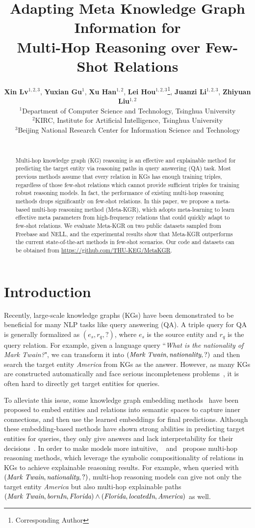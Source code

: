 \documentclass[11pt,a4paper]{article}
\title{Adapting Meta Knowledge Graph Information for \\ Multi-Hop Reasoning over Few-Shot Relations}
\author{
    \textbf{Xin Lv}$^{1,2,3}$, \textbf{Yuxian Gu}$^{1}$, \textbf{Xu Han}$^{1,2}$, \textbf{Lei Hou}$^{1,2,3}$\thanks{\quad Corresponding Author}\hspace{0.5em}, \textbf{Juanzi Li}$^{1,2,3}$, \textbf{Zhiyuan Liu}$^{1,2}$\\
    $^1$Department of Computer Science and Technology, Tsinghua University \\
    $^2$KIRC, Institute for Artificial Intelligence, Tsinghua University \\
     $^3$Beijing National Research Center for Information Science and Technology \\
    \email{\{lv-x18,gu-yx17,hanxu17\}@mails.tsinghua.edu.cn}\\
    \email{\{houlei,lijuanzi,liuzy\}@tsinghua.edu.cn}
    }
\date{}
\begin{document}
\maketitle
\begin{abstract}
Multi-hop knowledge graph (KG) reasoning is an effective and explainable method for predicting the target entity via reasoning paths in query answering (QA) task. Most previous methods assume that every relation in KGs has enough training triples, regardless of those few-shot relations which cannot provide sufficient triples for training robust reasoning models. In fact, the performance of existing multi-hop reasoning methods drops significantly on few-shot relations. In this paper, we propose a meta-based multi-hop reasoning method (Meta-KGR), which adopts meta-learning to learn effective meta parameters from high-frequency relations that could quickly adapt to few-shot relations. We evaluate Meta-KGR on two public datasets sampled from Freebase and NELL, and the experimental results show that Meta-KGR outperforms the current state-of-the-art methods in few-shot scenarios. Our code and datasets can be obtained from  \url{https://github.com/THU-KEG/MetaKGR}.

\end{abstract}

\section{Introduction}

Recently, large-scale knowledge graphs (KGs) have been demonstrated to be beneficial for many NLP tasks like query answering (QA). A triple query for QA is generally formalized as $(e_s, r_q, ?)$, where $e_s$ is the source entity and $r_q$ is the query relation. 
For example, given a language query ``\textit{What is the nationality of Mark Twain?}", we can transform it into $(\emph{Mark Twain}, \textit{nationality}, ?)$ and then search the target entity \emph{America} from KGs as the answer.
However, as many KGs are constructed automatically and face serious incompleteness problems~\cite{TransE}, it is often hard to directly get target entities for queries.

To alleviate this issue, some knowledge graph embedding methods~\cite{TransE,ConvE} have been proposed to embed entities and relations into semantic spaces to capture inner connections, and then use the learned embeddings for final predictions. Although these embedding-based methods have shown strong abilities in predicting target entities for queries, they only give answers and lack interpretability for their decisions~\cite{MultiHop}. In order to make models more intuitive, ~\citet{MINERVA} and~\citet{MultiHop} propose multi-hop reasoning methods, which leverage the symbolic compositionality of relations in KGs to achieve explainable reasoning results. For example, when queried with $(\emph{Mark Twain}, \textit{nationality}, ?)$, multi-hop reasoning models can give not only the target entity \textit{America} but also multi-hop explainable paths $(\emph{Mark Twain}, \textit{bornIn}, \emph{Florida}) \wedge (\emph{Florida}, \textit{locatedIn}, \emph{America})$ as well.
\end{document}
